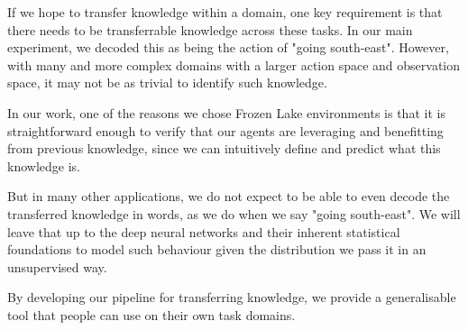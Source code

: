 If we hope to transfer knowledge within a domain, one key requirement is that there needs to be transferrable knowledge across these tasks. In our main experiment, we decoded this as being the action of "going south-east". However, with many and more complex domains with a larger action space and observation space, it may not be as trivial to identify such knowledge.

In our work, one of the reasons we chose Frozen Lake environments is that it is straightforward enough to verify that our agents are leveraging and benefitting from previous knowledge, since we can intuitively define and predict what this knowledge is.

But in many other applications, we do not expect to be able to even decode the transferred knowledge in words, as we do when we say "going south-east". We will leave that up to the deep neural networks and their inherent statistical foundations to model such behaviour given the distribution we pass it in an unsupervised way.

By developing our pipeline for transferring knowledge, we provide a generalisable tool that people can use on their own task domains.

